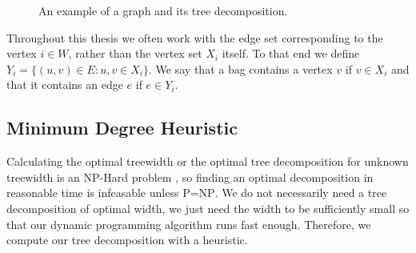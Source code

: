 \documentclass[12pt]{article}
\newcommand{\ccP}[0]{\textsc{P}}
\newcommand{\ccNP}[0]{\textsc{NP}}
\begin{document}
    \begin{figure}
    \centering
    \caption{An example of a graph and its tree decomposition.}
    \label{fig:td}
    \end{figure}

    Throughout this thesis we often work with the edge set corresponding to the vertex $i \in W$, rather
    than the vertex set $X_i$ itself. To that end we define $Y_i = \{(u,v) \in E: u,v \in X_i \}$.
    We say that a bag contains a vertex $v$ if $v \in X_i$ and that it contains an edge $e$ if $e \in Y_i$.


    \subsection{Minimum Degree Heuristic}
    \label{sec:td-heuristic}
    Calculating the optimal treewidth or the optimal tree decomposition for unknown treewidth is an
    \ccNP-Hard problem \cite{tw-hardness}, so finding an optimal decomposition in reasonable time is
    infeasable unless \ccP=\ccNP\@. We do not necessarily need a tree decomposition of optimal
    width, we just need the width to be sufficiently small so that our dynamic programming algorithm
    runs fast enough. Therefore, we compute our tree decomposition with a heuristic.
\end{document}
